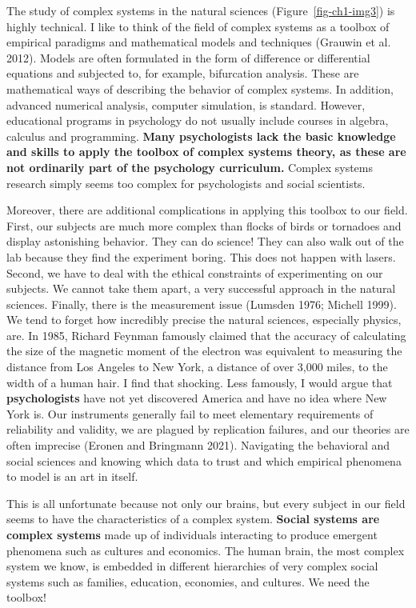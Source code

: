 \documentclass[
  letterpaper,
]{scrbook}
\begin{document}
The study of complex systems in the natural sciences
(Figure~\ref{fig-ch1-img3}) is highly technical. I like to think of the
field of complex systems as a toolbox of empirical paradigms and
mathematical models and techniques (Grauwin et al. 2012). Models are
often formulated in the form of difference or differential equations and
subjected to, for example, bifurcation analysis. These are mathematical
ways of describing the behavior of complex systems. In addition,
advanced numerical analysis, computer simulation, is standard. However,
educational programs in psychology do not usually include courses in
algebra, calculus and programming. \textbf{Many psychologists lack the
basic knowledge and skills to apply the toolbox of complex systems
theory, as these are not ordinarily part of the psychology curriculum.}
Complex systems research simply seems too complex for psychologists and
social scientists.

Moreover, there are additional complications in applying this toolbox to
our field. First, our subjects are much more complex than flocks of
birds or tornadoes and display astonishing behavior. They can do
science! They can also walk out of the lab because they find the
experiment boring. This does not happen with lasers. Second, we have to
deal with the ethical constraints of experimenting on our subjects. We
cannot take them apart, a very successful approach in the natural
sciences. Finally, there is the measurement issue (Lumsden 1976; Michell
1999). We tend to forget how incredibly precise the natural sciences,
especially physics, are. In 1985, Richard Feynman famously claimed that
the accuracy of calculating the size of the magnetic moment of the
electron was equivalent to measuring the distance from Los Angeles to
New York, a distance of over 3,000 miles, to the width of a human hair.
I find that shocking. Less famously, I would argue that
\textbf{psychologists} have not yet discovered America and have no idea
where New York is. Our instruments generally fail to meet elementary
requirements of reliability and validity, we are plagued by replication
failures, and our theories are often imprecise (Eronen and Bringmann
2021). Navigating the behavioral and social sciences and knowing which
data to trust and which empirical phenomena to model is an art in
itself.

This is all unfortunate because not only our brains, but every subject
in our field seems to have the characteristics of a complex system.
\textbf{Social systems are complex systems} made up of individuals
interacting to produce emergent phenomena such as cultures and
economics. The human brain, the most complex system we know, is embedded
in different hierarchies of very complex social systems such as
families, education, economies, and cultures. We need the toolbox!
\end{document}
